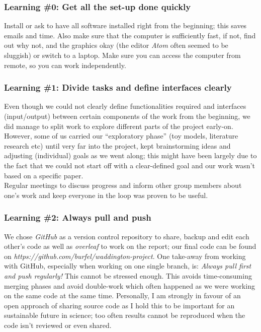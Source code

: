 \documentclass[journal, a4paper]{IEEEtran}
\begin{document}

\hfill
\subsubsection{Learning \#0: Get all the set-up done quickly}
Install or ask to have all software installed right from the beginning; this saves emails and time. Also make sure that the computer is sufficiently fast, if not, find out why not, and the graphics okay (the editor \textit{Atom} often seemed to be sluggish) or switch to a laptop. Make sure you can access the computer from remote, so you can work independently.

\hfill
\subsubsection{Learning \#1: Divide tasks and define interfaces clearly}
Even though we could not clearly define functionalities required and interfaces (input/output) between certain components of the work from the beginning, we did manage to split work to explore different parts of the project early-on. However, some of us carried our “exploratory phase” (toy models, literature research etc) until very far into the project, kept brainstorming ideas and adjusting (individual) goals as we went along; this might have been largely due to the fact that we could not start off with a clear-defined goal and our work wasn’t based on a specific paper. \\
Regular meetings to discuss progress and inform other group members about one’s work and keep everyone in the loop was proven to be useful. 

\hfill
\subsubsection{Learning \#2: Always pull and push}
We chose \textit{GitHub} as a version control repository to share, backup and edit each other’s code as well as \textit{overleaf} to work on the report; our final code can be found on \textit{https://github.com/burfel/waddington-project}. One take-away from working with GitHub, especially when working on one single branch, is: \textit{Always pull first and push regularly!} This cannot be stressed enough. This avoids time-consuming merging phases and avoid double-work which often happened as we were working on the same code at the same time. 
Personally, I am strongly in favour of an open approach of sharing source code as I hold this to be important for an sustainable future in science; too often results cannot be reproduced when the code isn’t reviewed or even shared.
\end{document}
